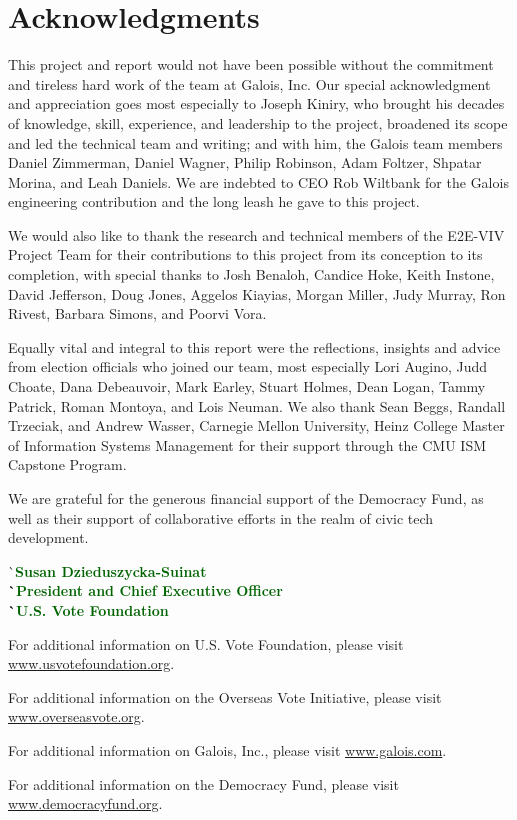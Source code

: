 \chapter*{Acknowledgments}
\label{chapter:acknowledgments}

This project and report would not have been possible without the
commitment and tireless hard work of the team at Galois, Inc. Our
special acknowledgment and appreciation goes most especially to Joseph
Kiniry, who brought his decades of knowledge, skill, experience, and
leadership to the project, broadened its scope and led the technical
team and writing; and with him, the Galois team members Daniel
Zimmerman, Daniel Wagner, Philip Robinson, Adam Foltzer, Shpatar
Morina, and Leah Daniels. We are indebted to CEO Rob Wiltbank for the
Galois engineering contribution and the long leash he gave to this
project.

We would also like to thank the research and technical members of the
E2E-VIV Project Team for their contributions to this project from its
conception to its completion, with special thanks to Josh Benaloh,
Candice Hoke, Keith Instone, David Jefferson, Doug Jones, Aggelos
Kiayias, Morgan Miller, Judy Murray, Ron Rivest, Barbara Simons, and
Poorvi Vora.

Equally vital and integral to this report were the reflections,
insights and advice from election officials who joined our team, most
especially Lori Augino, Judd Choate, Dana Debeauvoir, Mark Earley,
Stuart Holmes, Dean Logan, Tammy Patrick, Roman Montoya, and Lois
Neuman.  We also thank Sean Beggs, Randall Trzeciak, and Andrew
Wasser, Carnegie Mellon University, Heinz College Master of
Information Systems Management for their support through the CMU ISM
Capstone Program.

We are grateful for the generous financial support of the Democracy
Fund, as well as their support of collaborative efforts in the realm
of civic tech development.


\begin{tabbing}
\` \sffamily\bfseries\textcolor{DarkGreen}{Susan Dzieduszycka-Suinat} \\
\` \sffamily\textcolor{DarkGreen}{President and Chief Executive Officer} \\
\` \sffamily\textcolor{DarkGreen}{U.S. Vote Foundation}
\end{tabbing}

\vspace{\fill}

For additional information on U.S. Vote Foundation, please visit
\url{www.usvotefoundation.org}.   

For additional information on the Overseas Vote Initiative, please
visit \url{www.overseasvote.org}. 

For additional information on Galois, Inc., please visit
\url{www.galois.com}.

For additional information on the Democracy Fund, please visit
\url{www.democracyfund.org}.

